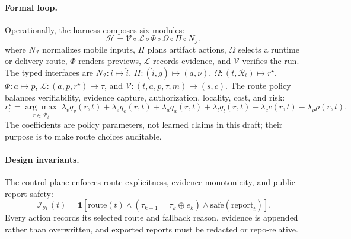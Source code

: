 \documentclass{article}
\begin{document}
\paragraph{Formal loop.}
Operationally, the harness composes six modules:
\[
\mathcal{H}=\mathcal{V}\circ\mathcal{L}\circ\Phi\circ\Omega\circ\Pi\circ N_{\mathcal{I}},
\]
where \(N_{\mathcal{I}}\) normalizes mobile inputs, \(\Pi\) plans artifact actions, \(\Omega\) selects a runtime or delivery route, \(\Phi\) renders previews, \(\mathcal{L}\) records evidence, and \(\mathcal{V}\) verifies the run.
The typed interfaces are \(N_{\mathcal{I}}:i\mapsto\hat{i}\), \(\Pi:(\hat{i},g)\mapsto(a,\nu)\), \(\Omega:(t,\mathcal{R}_t)\mapsto r^\star\), \(\Phi:a\mapsto p\), \(\mathcal{L}:(a,p,r^\star)\mapsto\tau\), and \(\mathcal{V}:(t,a,p,\tau,m)\mapsto(s,c)\).
The route policy balances verifiability, evidence capture, authorization, locality, cost, and risk:
\[
r_t^\star =
\underset{r\in\mathcal{R}_t}{\arg\max}\;
\lambda_v q_v(r,t)+\lambda_e q_e(r,t)+\lambda_a q_a(r,t)+\lambda_l q_l(r,t)
-\lambda_c c(r,t)-\lambda_\rho \rho(r,t).
\]
The coefficients are policy parameters, not learned claims in this draft; their purpose is to make route choices auditable.

\paragraph{Design invariants.}
The control plane enforces route explicitness, evidence monotonicity, and public-report safety:
\[
\mathcal{I}_{\mathcal{H}}(t)=\mathbf{1}[\mathrm{route}(t)\land(\tau_{k+1}=\tau_k\oplus e_k)\land\mathrm{safe}(\mathrm{report}_t)].
\]
Every action records its selected route and fallback reason, evidence is appended rather than overwritten, and exported reports must be redacted or repo-relative.

\begin{center}
{\setlength{\fboxsep}{4pt}
}
\end{center}
\end{document}
